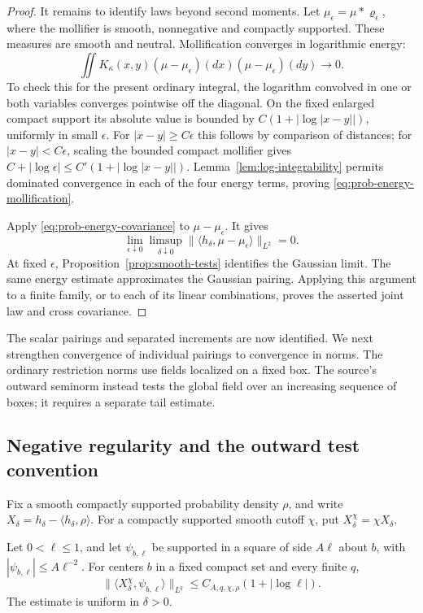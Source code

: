 \begin{proof}
It remains to identify laws beyond second moments. Let
\(\mu_\epsilon=\mu*\varrho_\epsilon\), where the mollifier is smooth,
nonnegative and compactly supported. These measures are smooth and
neutral. Mollification converges in logarithmic energy:
\begin{equation}\label{eq:prob-energy-mollification}
 \iint K_\kappa(x,y)
       (\mu-\mu_\epsilon)(dx)(\mu-\mu_\epsilon)(dy)
       \longrightarrow0.
\end{equation}
To check this for the present ordinary integral, the logarithm convolved
in one or both variables converges pointwise off the diagonal. On the
fixed enlarged compact support its absolute value is bounded by
\(C(1+|\log|x-y||)\), uniformly in small \(\epsilon\).
For \(|x-y|\ge C\epsilon\) this follows by comparison of distances;
for \(|x-y|<C\epsilon\), scaling the bounded compact mollifier gives
\(C+|\log\epsilon|\le C'(1+|\log|x-y||)\).
Lemma~\ref{lem:log-integrability} permits dominated convergence in each
of the four energy terms, proving
\eqref{eq:prob-energy-mollification}.

Apply \eqref{eq:prob-energy-covariance} to
\(\mu-\mu_\epsilon\). It gives
\[
 \lim_{\epsilon\downarrow0}\limsup_{\delta\downarrow0}
 \|\langle h_\delta,\mu-\mu_\epsilon\rangle\|_{L^2}=0.
\]
At fixed \(\epsilon\), Proposition~\ref{prop:smooth-tests} identifies
the Gaussian limit. The same energy estimate approximates the Gaussian
pairing. Applying this argument to a finite family, or to each of its
linear combinations, proves the asserted joint law and cross covariance.
\end{proof}

The scalar pairings and separated increments are now identified. We next
strengthen convergence of individual pairings to convergence in norms.
The ordinary restriction norms use fields localized on a fixed box.
The source's outward seminorm instead tests the global field over an
increasing sequence of boxes; it requires a separate tail estimate.

\subsection{Negative regularity and the outward test convention}

Fix a smooth compactly supported probability density \(\rho\), and write
\(X_\delta=h_\delta-\langle h_\delta,\rho\rangle\).
For a compactly supported smooth cutoff \(\chi\), put
\(X_\delta^\chi=\chi X_\delta\).

\begin{lemma}\label{lem:pinned-averages}
Let \(0<\ell\le1\), and let \(\psi_{b,\ell}\) be supported in a square
of side \(A\ell\) about \(b\), with
\(|\psi_{b,\ell}|\le A\ell^{-2}\). For centers \(b\) in a fixed compact
set and every finite \(q\),
\begin{equation}\label{eq:prob-pinned-averages}
 \|\langle X_\delta^\chi,\psi_{b,\ell}\rangle\|_{L^q}
 \le C_{A,q,\chi,\rho}(1+|\log\ell|).
\end{equation}
The estimate is uniform in \(\delta>0\).
\end{lemma}


